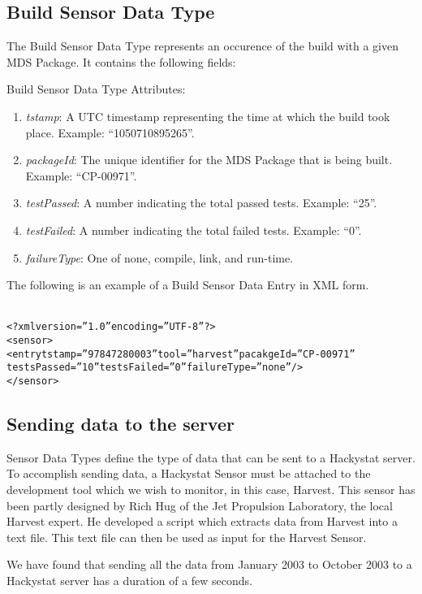\subsection{Build Sensor Data Type}
The Build Sensor Data Type represents an occurence of the build with a
given MDS Package.  It contains the following fields:

\begin{description}
\item Build Sensor Data Type Attributes:
\begin{enumerate}
\item \emph{tstamp}: A UTC timestamp representing the time at which the
build took place.  Example: ``1050710895265''.
\item \emph{packageId}: The unique identifier for the MDS Package that is
being built.  Example: ``CP-00971''.
\item \emph{testPassed}: A number indicating the total passed tests.
Example: ``25''.
\item \emph{testFailed}: A number indicating the total failed tests.
Example: ``0''.
\item \emph{failureType}: One of none, compile, link, and run-time.
\end{enumerate}
\end{description}

The following is an example of a Build Sensor Data Entry in XML form.

\begin{alltt}
{\small{}
<?xml version=''1.0'' encoding=''UTF-8'' ?>
<sensor>
  <entry tstamp=''97847280003'' tool=''harvest'' pacakgeId=''CP-00971''
    testsPassed=''10'' testsFailed=''0'' failureType=''none'' />
</sensor>
}
\end{alltt}


\subsection{Sending data to the server}
Sensor Data Types define the type of data that can be sent to a Hackystat
server.  To accomplish sending data, a Hackystat Sensor must be attached to
the development tool which we wish to monitor, in this case, Harvest.  This
sensor has been partly designed by Rich Hug of the Jet Propulsion
Laboratory, the local Harvest expert.  He developed a script which extracts
data from Harvest into a text file.  This text file can then be used as
input for the Harvest Sensor.

We have found that sending all the data from January 2003 to October 2003
to a Hackystat server has a duration of a few seconds.



